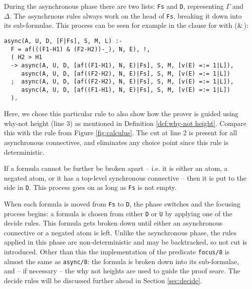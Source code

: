 During the asynchronous phase there are two lists: \texttt{Fs} and \texttt{D}, representing $\Gamma$ and $\Delta$.
The asynchrnous rules always work on the head of \texttt{Fs}, breaking it down into its sub-formulae.
This process can be seen for example in the clause for with ($\!\:\&\:\!$):
\begin{verbatim}
async(A, U, D, [F|Fs], S, M, L) :-
  F = af(((F1-H1) & (F2-H2))-_), N, E), !,
  ( H2 > H1	
  -> async(A, U, D, [af((F1-H1), N, E)|Fs], S, M, [v(E) =:= 1|L]), 
     async(A, U, D, [af((F2-H2), N, E)|Fs], S, M, [v(E) =:= 1|L]) 
  ;  async(A, U, D, [af((F2-H2), N, E)|Fs], S, M, [v(E) =:= 1|L]),
     async(A, U, D, [af((F1-H1), N, E)|Fs], S, M, [v(E) =:= 1|L])
  ).
\end{verbatim}
Here, we chose this particular rule to also show how the prover is guided using why-not height (line 3) as mentioned in Definition \ref{def:why-not height}.
Compare this with the \derRule{\displaywith} rule from Figure \ref{fig:calculus}.
The cut at line 2 is present for all asynchronous connectives, and eliminates any choice point since this rule is deterministic.

If a formula cannot be further be broken apart -- i.e. it is either an atom, a negated atom, or it has a top-level synchronous connective -- then it is put to the side in \texttt{D}.
This process goes on as long as \texttt{Fs} is not empty.

When each formula is moved from \texttt{Fs} to \texttt{D}, the phase switches and the focusing process begins: a formula is chosen from either \texttt{D} or \texttt{U} by applying one of the decide rules.
This formula gets broken down until either an asynchronous connective or a negated atom is left. 
Unlike the asynchronous phase, the rules applied in this phase are non-deterministic and may be backtracked, so not cut is introduced.
Other than this the implementation of the predicate \texttt{focus/8} is almost the same as \texttt{async/8}: the formula is broken down into its sub-formulae, and -- if necessary -- the why not heights are used to guide the proof searc.
The decide rules will be discussed further ahead in Section \ref{sec:decide}.

